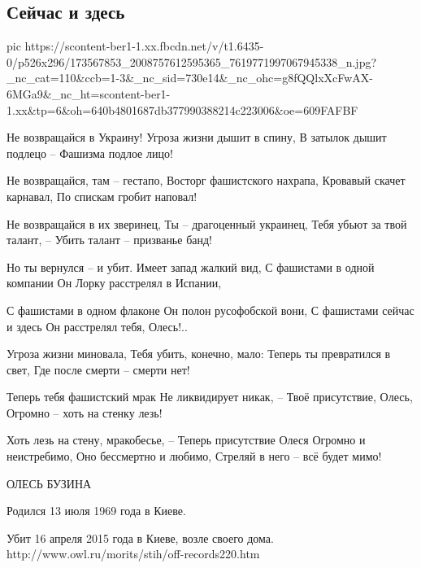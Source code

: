  
 
 
 
 

\subsection{Сейчас и здесь}
\label{sec:16_04_2021.fb.morits_junna.1.buzina_oles_stih}


\ifcmt
  pic https://scontent-ber1-1.xx.fbcdn.net/v/t1.6435-0/p526x296/173567853_2008757612595365_7619771997067945338_n.jpg?_nc_cat=110&ccb=1-3&_nc_sid=730e14&_nc_ohc=g8fQQlxXcFwAX-6MGa9&_nc_ht=scontent-ber1-1.xx&tp=6&oh=640b4801687db377990388214c223006&oe=609FAFBF
\fi

Не возвращайся в Украину!
Угроза жизни дышит в спину,
В затылок дышит подлецо –
Фашизма подлое лицо!

Не возвращайся, там – гестапо,
Восторг фашистского нахрапа,
Кровавый скачет карнавал,
По спискам гробит наповал!

Не возвращайся в их зверинец,
Ты – драгоценный украинец,
Тебя убьют за твой талант, –
Убить талант – призванье банд!

Но ты вернулся – и убит.
Имеет запад жалкий вид,
С фашистами в одной компании
Он Лорку расстрелял в Испании,

С фашистами в одном флаконе
Он полон русофобской вони,
С фашистами сейчас и здесь
Он расстрелял тебя, Олесь!..

Угроза жизни миновала,
Тебя убить, конечно, мало:
Теперь ты превратился в свет,
Где после смерти – смерти нет!

Теперь тебя фашистский мрак
Не ликвидирует никак, –
Твоё присутствие, Олесь,
Огромно – хоть на стенку лезь!

Хоть лезь на стену, мракобесье, –
Теперь присутствие Олеся
Огромно и неистребимо,
Оно бессмертно и любимо,
Стреляй в него – всё будет мимо!

ОЛЕСЬ БУЗИНА

Родился 13 июля 1969 года в Киеве.

Убит 16 апреля 2015 года в Киеве, возле своего дома.
http://www.owl.ru/morits/stih/off-records220.htm
